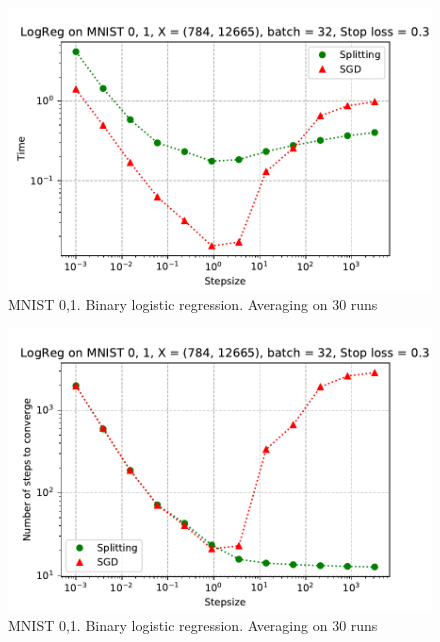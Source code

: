 \documentclass{article}
\begin{document}
\begin{figure}[ht]
\vskip 0.2in
\begin{center}
\centerline{\includegraphics[width=\columnwidth]{sgd_split_iterations_logreg.pdf}}
\caption{MNIST 0,1. Binary logistic regression. Averaging on 30 runs}
\label{strang:fig:logreg_step_iter}
\end{center}
\vskip -0.2in
\end{figure}

\begin{figure}[ht]
\vskip 0.2in
\begin{center}
\centerline{\includegraphics[width=\columnwidth]{sgd_split_time_logreg.pdf}}
\caption{MNIST 0,1. Binary logistic regression. Averaging on 30 runs}
\label{strang:fig:logreg_step_time}
\end{center}
\vskip -0.2in
\end{figure}
\end{document}
